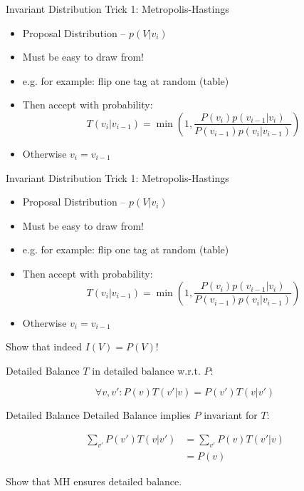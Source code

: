 \documentclass[11pt]{beamer}
\begin{document}
	\begin{frame}{Invariant Distribution Trick 1: Metropolis-Hastings}
		\begin{itemize}
			\item Proposal Distribution -- $p(V|v_i)$
			\item Must be easy to draw from!
			\item e.g. for example: flip one tag at random (table)
			\item Then accept with probability:
				$$T(v_i|v_{i-1}) = \min\left(1,\frac{P(v_i)p(v_{i-1}|v_i)}{P(v_{i-1})p(v_i|v_{i-1})}\right)$$
			\item Otherwise $v_i = v_{i-1}$
		\end{itemize}
	\end{frame}
	
	\begin{frame}{Invariant Distribution Trick 1: Metropolis-Hastings}
		\begin{itemize}
			\item Proposal Distribution -- $p(V|v_i)$
			\item Must be easy to draw from!
			\item e.g. for example: flip one tag at random (table)
			\item Then accept with probability:
				$$T(v_i|v_{i-1}) = \min\left(1,\frac{P(v_i)p(v_{i-1}|v_i)}{P(v_{i-1})p(v_i|v_{i-1})}\right)$$
			\item Otherwise $v_i = v_{i-1}$
		\end{itemize}
		
		\vspace{10pt} Show that indeed $I(V) = P(V)$!
	\end{frame}
	
	\begin{frame}{Detailed Balance}
		$T$ in detailed balance w.r.t. $P$:
		
		$$\forall v,v': P(v)T(v'|v) = P(v')T(v|v') $$
	\end{frame}
	
	\begin{frame}{Detailed Balance}
		Detailed Balance implies $P$ invariant for $T$:
			
		\begin{align*}
			\sum_{v'} P(v') T(v|v') & = \sum_{v'} P(v) T(v'|v) \\
			& = P(v)
		\end{align*}
		
		\vspace{10pt} Show that MH ensures detailed balance.
	\end{frame}
	
\end{document}
